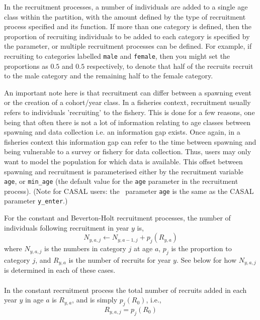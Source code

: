 In the recruitment processes, a number of individuals are added to a single age class within the partition, with the amount defined by the type of recruitment process specified and its function. If more than one category is defined, then the proportion of recruiting individuals to be added to each category is specified by the  parameter, or multiple recruitment processes can be defined. For example, if recruiting to categories labelled \texttt{male} and \texttt{female}, then you might set the proportions as $0.5$ and $0.5$ respectively, to denote that half of the recruits recruit to the male category and the remaining half to the female category. 

An important note here is that recruitment can differ between a spawning event or the creation of a cohort/year class. In a fisheries context, recruitment usually refers to individuals 'recruiting' to the fishery. This is done for a few reasons, one being that often there is not a lot of information relating to age classes between spawning and data collection i.e. an information gap exists. Once again, in a fisheries context this information gap can refer to the time between spawning and being vulnerable to a survey or fishery for data collection. Thus, users may only want to model the population for which data is available. This offset between spawning and recruitment is parameterised either by the recruitment variable \texttt{age}, or \texttt{min\_age} (the default value for the \texttt{age} parameter in the recruitment process). (Note for CASAL users: the \CNAME\ parameter \texttt{age} is the same as the CASAL parameter \texttt{y\_enter}.)

For the constant and Beverton-Holt recruitment processes, the  number of individuals following recruitment in year $y$ is,  
\begin{equation}
N_{y,a,j} \leftarrow N_{y,a - 1,j} + p_j(R_{y,a})
\end{equation}
where $N_{y,a,j}$ is the numbers in category $j$ at age $a$, $p_j$ is the proportion to category $j$, and $R_{y,a}$ is the number of recruits for year $y$. See below for how $N_{y,a,j}$ is determined in each of these cases.

\paragraph{}\label{subsubsec:constant-recruitment}

In the constant recruitment process the total number of recruits added in each year $y$ in age $a$ is $R_{y,a}$, and is simply $p_j(R_0)$, i.e.,
\begin{equation}
  R_{y,a,j} = p_j(R_0)
\end{equation}

